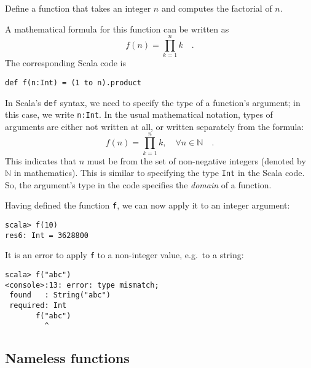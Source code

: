 Define a function that takes an integer $n$ and computes the factorial
of $n$.

A mathematical formula for this function can be written as
\[
f\left(n\right)=\prod_{k=1}^{n}k\quad.
\]
The corresponding Scala code is
\begin{lstlisting}
def f(n:Int) = (1 to n).product
\end{lstlisting}

In Scala's \texttt{}\lstinline!def! syntax, we need to specify the
type of a function's argument; in this case, we write \lstinline!n:Int!.
In the usual mathematical notation, types of arguments are either
not written at all, or written separately from the formula:
\[
f(n)=\prod_{k=1}^{n}k,\quad\forall n\in\mathbb{N}\quad.
\]
This indicates that $n$ must be from the set of non-negative integers
(denoted by $\mathbb{N}$ in mathematics). This is similar to specifying
the type \texttt{}\lstinline!Int! in the Scala code. So, the argument's
type in the code specifies the \emph{domain} of a function.

Having defined the function \lstinline!f!, we can now apply it to
an integer argument: 
\begin{lstlisting}
scala> f(10)
res6: Int = 3628800
\end{lstlisting}
It is an error to apply \lstinline!f! to a non-integer value, e.g.\ to
a string:
\begin{lstlisting}
scala> f("abc")
<console>:13: error: type mismatch;
 found   : String("abc")
 required: Int
       f("abc")
         ^ 
\end{lstlisting}


\subsection{Nameless functions}

